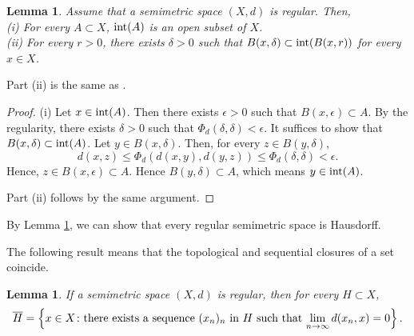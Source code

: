 \documentclass[a4paper, reqno, 11pt]{amsart}
\newtheorem{Lem}[Thm]{Lemma}
\theoremstyle{definition}
\begin{document}
\begin{Lem}\label{lem:interior-open}
Assume that a semimetric space $(X,d)$ is regular. Then,\\
(i) For every $A \subset X$, $\textup{int}(A)$ is an open subset of $X$. \\
(ii) For every $r > 0$, there exists $\delta > 0$ such that $B(x,\delta) \subset \textup{int}(B(x,r))$ for every $x \in X$. 
\end{Lem}

Part (ii) is the same as \cite[Lemma 2]{KocsisPales2022}. 

\begin{proof}
(i) Let $x \in \textup{int}(A)$. 
Then there exists $\epsilon > 0$ such that $B(x,\epsilon) \subset A$. 
By the regularity, there exists $\delta > 0$ such that $\Phi_d (\delta, \delta) < \epsilon$. 
It suffices to show that $B(x,\delta) \subset  \textup{int}(A)$.  
Let $y \in B(x,\delta)$. 
Then, for every $z \in B(y,\delta)$, 
\[ d(x,z) \le \Phi_d (d(x,y), d(y,z)) \le \Phi_d (\delta, \delta) < \epsilon. \]
Hence, $z \in B(x,\epsilon) \subset A$. 
Hence $B(y,\delta) \subset A$, which means $y \in \textup{int}(A)$. 

Part (ii) follows by the same argument. 
\end{proof}

By Lemma \ref{lem:interior-open}, we can show that every regular semimetric space is Hausdorff. 

The following result means that the topological and sequential closures of a set coincide. 

\begin{Lem}\label{lem:seq-closure}
If a semimetric space $(X,d)$ is regular, then for every $H \subset X$, 
\begin{equation}\label{eq:closure-limit} 
\overline{H} = \left\{x \in X \colon \textup{there exists a sequence $(x_n)_n$ in $H$ such that $\lim_{n \to \infty} d(x_n, x) = 0$} \right\}. 
\end{equation}
\end{Lem}
\end{document}
